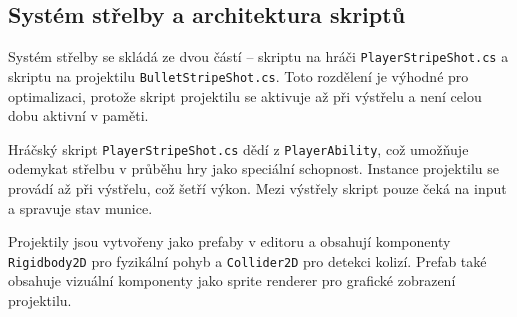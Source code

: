 \subsection{Systém střelby a architektura skriptů}

Systém střelby se skládá ze dvou částí -- skriptu na hráči \texttt{PlayerStripeShot.cs} a skriptu na projektilu \texttt{BulletStripeShot.cs}. Toto rozdělení je výhodné pro optimalizaci, protože skript projektilu se aktivuje až při výstřelu a není celou dobu aktivní v paměti.

Hráčský skript \texttt{PlayerStripeShot.cs} dědí z \texttt{PlayerAbility}, což umožňuje odemykat střelbu v průběhu hry jako speciální schopnost. Instance projektilu se provádí až při výstřelu, což šetří výkon. Mezi výstřely skript pouze čeká na input a spravuje stav munice.

Projektily jsou vytvořeny jako prefaby v editoru a obsahují komponenty \texttt{Rigidbody2D} pro fyzikální pohyb a \texttt{Collider2D} pro detekci kolizí. Prefab také obsahuje vizuální komponenty jako sprite renderer pro grafické zobrazení projektilu.